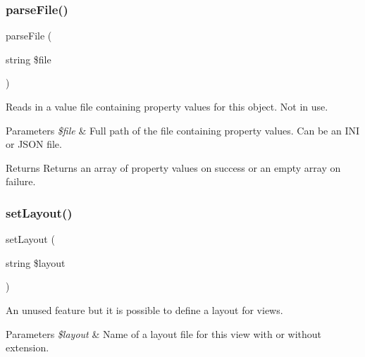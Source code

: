 \subsubsection{\texorpdfstring{parse\+File()}{parseFile()}}
{\footnotesize\ttfamily parse\+File (\begin{DoxyParamCaption}\item[{string}]{\$file }\end{DoxyParamCaption})\hspace{0.3cm}{\ttfamily [private]}}

Reads in a value file containing property values for this object. Not in use. 
\begin{DoxyParams}{Parameters}
{\em \$file} & Full path of the file containing property values. Can be an I\+NI or J\+S\+ON file. \\
\hline
\end{DoxyParams}
\begin{DoxyReturn}{Returns}
Returns an array of property values on success or an empty array on failure. 
\end{DoxyReturn}

\mbox{\label{class_lora_1_1_page_view_a3178ecfe82b87d56467cd68c74300201}} 
\subsubsection{\texorpdfstring{set\+Layout()}{setLayout()}}
{\footnotesize\ttfamily set\+Layout (\begin{DoxyParamCaption}\item[{string}]{\$layout }\end{DoxyParamCaption})}

An unused feature but it is possible to define a layout for views. 
\begin{DoxyParams}{Parameters}
{\em \$layout} & Name of a layout file for this view with or without extension. \\
\hline
\end{DoxyParams}

